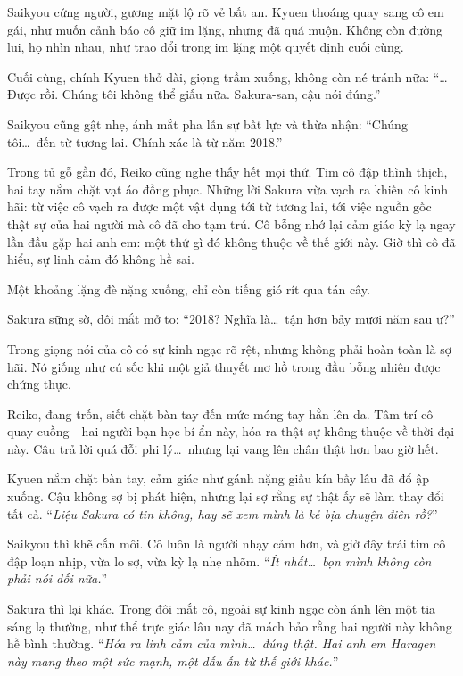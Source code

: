 \documentclass[../main.tex]{subfiles}
\begin{document}
Saikyou cứng người, gương mặt lộ rõ vẻ bất an. Kyuen thoáng quay sang cô em gái, như muốn cảnh báo cô giữ im lặng, nhưng đã quá muộn. Không còn đường lui, họ nhìn nhau, như trao đổi trong im lặng một quyết định cuối cùng.

Cuối cùng, chính Kyuen thở dài, giọng trầm xuống, không còn né tránh nữa: ``\dots Được rồi. Chúng tôi không thể giấu nữa. Sakura-san, cậu nói đúng.''

Saikyou cũng gật nhẹ, ánh mắt pha lẫn sự bất lực và thừa nhận: ``Chúng tôi\dots\ đến từ tương lai. Chính xác là từ năm 2018.''

Trong tủ gỗ gần đó, Reiko cũng nghe thấy hết mọi thứ. Tim cô đập thình thịch, hai tay nắm chặt vạt áo đồng phục. Những lời Sakura vừa vạch ra khiến cô kinh hãi: từ việc cô vạch ra được một vật dụng tới từ tương lai, tới việc nguồn gốc thật sự của hai người mà cô đã cho tạm trú. Cô bỗng nhớ lại cảm giác kỳ lạ ngay lần đầu gặp hai anh em: một thứ gì đó không thuộc về thế giới này. Giờ thì cô đã hiểu, sự linh cảm đó không hề sai.

Một khoảng lặng đè nặng xuống, chỉ còn tiếng gió rít qua tán cây.

Sakura sững sờ, đôi mắt mở to: ``2018? Nghĩa là\dots\ tận hơn bảy mươi năm sau ư?''

Trong giọng nói của cô có sự kinh ngạc rõ rệt, nhưng không phải hoàn toàn là sợ hãi. Nó giống như cú sốc khi một giả thuyết mơ hồ trong đầu bỗng nhiên được chứng thực.

Reiko, đang trốn, siết chặt bàn tay đến mức móng tay hằn lên da. Tâm trí cô quay cuồng - hai người bạn học bí ẩn này, hóa ra thật sự không thuộc về thời đại này. Câu trả lời quá đỗi phi lý\dots\ nhưng lại vang lên chân thật hơn bao giờ hết.

Kyuen nắm chặt bàn tay, cảm giác như gánh nặng giấu kín bấy lâu đã đổ ập xuống. Cậu không sợ bị phát hiện, nhưng lại sợ rằng sự thật ấy sẽ làm thay đổi tất cả. ``\textit{Liệu Sakura có tin không, hay sẽ xem mình là kẻ bịa chuyện điên rồ?}''

Saikyou thì khẽ cắn môi. Cô luôn là người nhạy cảm hơn, và giờ đây trái tim cô đập loạn nhịp, vừa lo sợ, vừa kỳ lạ nhẹ nhõm. ``\textit{Ít nhất\dots\ bọn mình không còn phải nói dối nữa.}''

Sakura thì lại khác. Trong đôi mắt cô, ngoài sự kinh ngạc còn ánh lên một tia sáng lạ thường, như thể trực giác lâu nay đã mách bảo rằng hai người này không hề bình thường. ``\textit{Hóa ra linh cảm của mình\dots\ đúng thật. Hai anh em Haragen này mang theo một sức mạnh, một dấu ấn từ thế giới khác.}''
\end{document}
